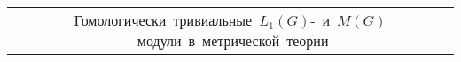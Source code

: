 \begin{scriptsize}
\begin{longtable}{|c|c|c|c|c|c|c|} 
\multicolumn{7}{c}{\mbox{Гомологически тривиальные $L_1(G)$- и $M(G)$-модули в метрической теории}}                                                                                                                                                                                                                                                                                                                                                                                                                                                                                                                                                                                                                                                                                                                                                                                                                                                                                                                                             \\
				 

\end{longtable}
\end{scriptsize}
